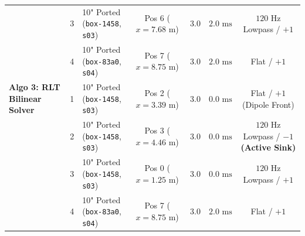 \documentclass[11pt,a4paper,titlepage]{article}
\begin{document}
\begin{table}[h!]
{\begin{tabular}{|l|c|l|c|c|c|c|}
& 3 & 10" Ported (\texttt{box-1458}, \texttt{s03}) & Pos 6 ($x = 7.68\text{ m}$) & 3.0 & $2.0\text{ ms}$ & $120\text{ Hz}$ Lowpass / $+1$ \\
& 4 & 10" Ported (\texttt{box-83a0}, \texttt{s04}) & Pos 7 ($x = 8.75\text{ m}$) & 3.0 & $2.0\text{ ms}$ & Flat / $+1$ \\ \hline
\textbf{Algo 3: RLT Bilinear Solver} 
& 1 & 10" Ported (\texttt{box-1458}, \texttt{s03}) & Pos 2 ($x = 3.39\text{ m}$) & 3.0 & $0.0\text{ ms}$ & Flat / $+1$ (Dipole Front) \\
& 2 & 10" Ported (\texttt{box-1458}, \texttt{s03}) & Pos 3 ($x = 4.46\text{ m}$) & 3.0 & $0.0\text{ ms}$ & $120\text{ Hz}$ Lowpass / \textbf{$-1$ (Active Sink)} \\
& 3 & 10" Ported (\texttt{box-1458}, \texttt{s03}) & Pos 0 ($x = 1.25\text{ m}$) & 3.0 & $0.0\text{ ms}$ & $120\text{ Hz}$ Lowpass / $+1$ \\
& 4 & 10" Ported (\texttt{box-83a0}, \texttt{s04}) & Pos 7 ($x = 8.75\text{ m}$) & 3.0 & $2.0\text{ ms}$ & Flat / $+1$ \\ \hline
\end{tabular}%
}
\end{table}

\newpage
\end{document}
